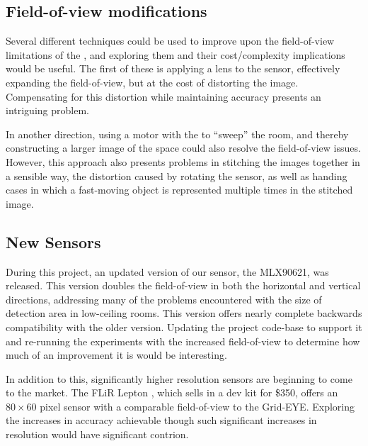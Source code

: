 \documentclass[../thesis/thesis.tex]{subfiles}
\begin{document}
\subsection{Field-of-view modifications}
Several different techniques could be used to improve upon the field-of-view limitations of the \mlx, and exploring them and their cost/complexity implications would be useful. The first of these is applying a lens to the sensor, effectively expanding the field-of-view, but at the cost of distorting the image. Compensating for this distortion while maintaining accuracy presents an intriguing problem.

In another direction, using a motor with the \mlx to ``sweep'' the room, and thereby constructing a larger image of the space could also resolve the field-of-view issues. However, this approach also presents problems in stitching the images together in a sensible way, the distortion caused by rotating the sensor, as well as handing cases in which a fast-moving object is represented multiple times in the stitched image.

\subsection{New Sensors}
During this project, an updated version of our sensor, the MLX90621, was released. This version doubles the field-of-view in both the horizontal and vertical directions, addressing many of the problems encountered with the size of detection area in low-ceiling rooms. This version offers nearly complete backwards compatibility with the older version. Updating the project code-base to support it and re-running the experiments with the increased field-of-view to determine how much of an improvement it is would be interesting.

In addition to this, significantly higher resolution sensors are beginning to come to the market. The FLiR Lepton \cite{flir}, which sells in a dev kit for \$350, offers an $80 \times 60$ pixel sensor with a comparable field-of-view to the Grid-EYE. Exploring the increases in accuracy achievable though such significant increases in resolution would have significant contrion.
 
\end{document}
